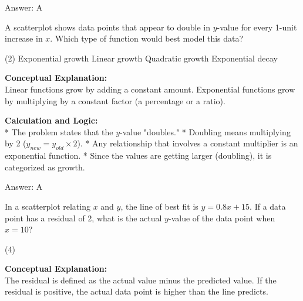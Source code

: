 \documentclass[11pt,paper=a4,answers]{exam}
\begin{document}
\begin{questions}
\begin{solution}
Answer: \colorbox{yellow!100}{A}
\end{solution}

\vspace{60pt}

\question
A scatterplot shows data points that appear to double in $y$-value for every 1-unit increase in $x$. Which type of function would best model this data?
\begin{tasks}(2)
    \task Exponential growth
    \task Linear growth
    \task Quadratic growth
    \task Exponential decay
\end{tasks}

\begin{solution}
\textbf{Conceptual Explanation:} \\
Linear functions grow by adding a constant amount. Exponential functions grow by multiplying by a constant factor (a percentage or a ratio).

\vspace{30pt}

\textbf{Calculation and Logic:} \\
* The problem states that the $y$-value "doubles."
* Doubling means multiplying by 2 ($y_{new} = y_{old} \times 2$).
* Any relationship that involves a constant multiplier is an exponential function.
* Since the values are getting larger (doubling), it is categorized as growth.

\vspace{30pt}

Answer: \colorbox{yellow!100}{A}
\end{solution}

\vspace{60pt}

\question
In a scatterplot relating $x$ and $y$, the line of best fit is $y = 0.8x + 15$. If a data point has a residual of 2, what is the actual $y$-value of the data point when $x = 10$?
\begin{tasks}(4)
\end{tasks}

\begin{solution}
\textbf{Conceptual Explanation:} \\
The residual is defined as the actual value minus the predicted value. If the residual is positive, the actual data point is higher than the line predicts.


\end{solution}
\end{questions}
\end{document}
